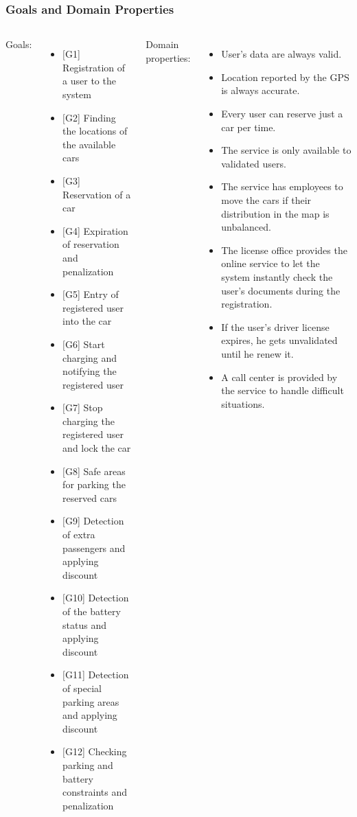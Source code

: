 \begin{frame}
	\frametitle{Goals and Domain Properties}
	\fontsize{7.5}{9}
	\begin{columns}[c]
		Goals:
		\begin{itemize}
			\item \([\)G1] Registration of a user to the system
			\item \([\)G2] Finding the locations of the available cars
			\item \([\)G3] Reservation of a car
			\item \([\)G4] Expiration of reservation and penalization
			\item \([\)G5] Entry of registered user into the car
			\item \([\)G6] Start charging and notifying the registered user
			\item \([\)G7] Stop charging the registered user and lock the car
			\item \([\)G8] Safe areas for parking the reserved cars
			\item \([\)G9] Detection of extra passengers and applying discount
			\item \([\)G10] Detection of the battery status and applying discount
			\item \([\)G11] Detection of special parking areas and applying discount
			\item \([\)G12] Checking parking and battery constraints and penalization
		\end{itemize}
	
		Domain properties:
		\begin{itemize}
			\item User's data are always valid.
			\item Location reported by the GPS is always accurate.
			\item Every user can reserve just a car per time.
			\item The service is only available to validated users.
			\item The service has employees to move the cars if their distribution in the map is unbalanced.
			\item The license office provides the online service to let the system instantly check the user's documents during the registration.
			\item If the user's driver license expires, he gets unvalidated until he renew it.
			\item A call center is provided by the service to handle difficult situations.
		\end{itemize}
	\end{columns}
\end{frame}

